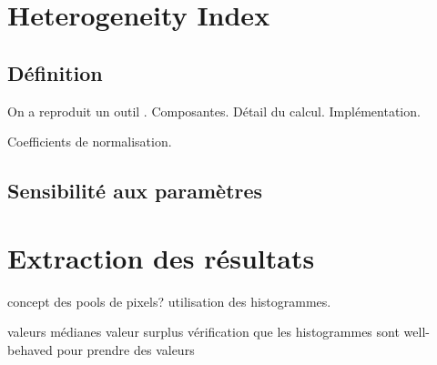 \section{Heterogeneity Index}
\subsection{Définition}

On a reproduit un outil \parencite{liu_2016}.
Composantes.
Détail du calcul.
Implémentation.

Coefficients de normalisation.

\subsection{Sensibilité aux paramètres}

\section{Extraction des résultats}

concept des pools de pixels?
utilisation des histogrammes.

valeurs médianes
valeur surplus
vérification que les histogrammes sont well-behaved pour prendre des valeurs

